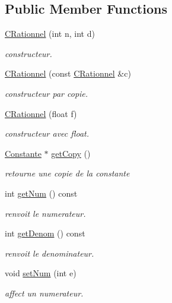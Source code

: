 \subsection*{Public Member Functions}
\begin{DoxyCompactItemize}
\item 
\hyperlink{class_c_rationnel_abb873462d03ad1522ff11f6a673eec43}{C\-Rationnel} (int n, int d)
\begin{DoxyCompactList}\small\item\em constructeur. \end{DoxyCompactList}\item 
\hyperlink{class_c_rationnel_a73f3e9dc846975b3364596a656bd9a11}{C\-Rationnel} (const \hyperlink{class_c_rationnel}{C\-Rationnel} \&c)
\begin{DoxyCompactList}\small\item\em constructeur par copie. \end{DoxyCompactList}\item 
\hyperlink{class_c_rationnel_ac046cfa1329cc37a236fe3d3adbd9663}{C\-Rationnel} (float f)
\begin{DoxyCompactList}\small\item\em constructeur avec float. \end{DoxyCompactList}\item 
\hyperlink{class_constante}{Constante} $\ast$ \hyperlink{class_c_rationnel_aba8783eae5fcf033e80ebf03c4776964}{get\-Copy} ()
\begin{DoxyCompactList}\small\item\em retourne une copie de la constante \end{DoxyCompactList}\item 
int \hyperlink{class_c_rationnel_a1d67342e386a8e3ad70ed3413f793c4f}{get\-Num} () const 
\begin{DoxyCompactList}\small\item\em renvoit le numerateur. \end{DoxyCompactList}\item 
int \hyperlink{class_c_rationnel_acad7d65e21a390f4fb253767413a1131}{get\-Denom} () const 
\begin{DoxyCompactList}\small\item\em renvoit le denominateur. \end{DoxyCompactList}\item 
void \hyperlink{class_c_rationnel_a361e29398792bc3d00d65c99d1dd2350}{set\-Num} (int e)
\begin{DoxyCompactList}\small\item\em affect un numerateur. \end{DoxyCompactList}\item 

\end{DoxyCompactItemize}
